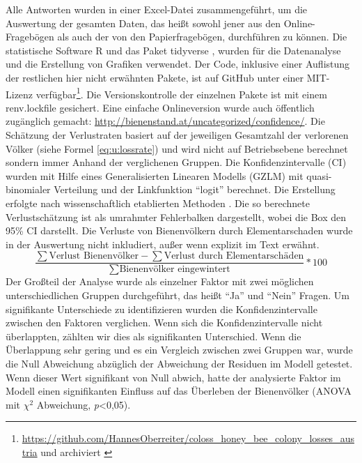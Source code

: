 Alle Antworten wurden in einer Excel-Datei zusammengeführt, um die Auswertung der gesamten Daten, das heißt sowohl jener aus den Online-Fragebögen als auch der von den Papierfragebögen, durchführen zu können. Die statistische Software R \citep{rcoreteam2020} und das Paket tidyverse \citep{wickham2019}, wurden für die Datenanalyse und die Erstellung von Grafiken verwendet. Der Code, inklusive einer Auflistung der restlichen hier nicht erwähnten Pakete, ist auf GitHub unter einer MIT-Lizenz verfügbar\footnote{\url{https://github.com/HannesOberreiter/coloss_honey_bee_colony_losses_austria} und archiviert \cite{HannesOberreiter2019}}. Die Versionskontrolle der einzelnen Pakete ist mit einem renv.lockfile gesichert. Eine einfache Onlineversion wurde auch öffentlich zugänglich gemacht: \url{http://bienenstand.at/uncategorized/confidence/}.
\newline
Die Schätzung der Verlustraten basiert auf der jeweiligen Gesamtzahl der verlorenen Völker (siehe Formel \ref{eq:u:lossrate}) und wird nicht auf Betriebsebene berechnet sondern immer Anhand der verglichenen Gruppen. Die Konfidenzintervalle (CI) wurden mit Hilfe eines Generalisierten Linearen Modells (GZLM) mit quasi-binomialer Verteilung und der Linkfunktion \enquote{logit} berechnet. Die Erstellung erfolgte nach wissenschaftlich etablierten Methoden \citep{vanderzee2013}. Die so berechnete Verlustschätzung ist als umrahmter Fehlerbalken dargestellt, wobei die Box den 95\% CI darstellt. Die Verluste von Bienenvölkern durch Elementarschaden wurde in der Auswertung nicht inkludiert, außer wenn explizit im Text erwähnt.
\begin{equation} \label{eq:u:lossrate}
\frac{
    \sum{\text{Verlust Bienenvölker}}-\sum{\text{Verlust durch Elementarschäden}}
    }{
    \sum{\text{Bienenvölker eingewintert}}
    }
    *100
\end{equation}
\newline
Der Großteil der Analyse wurde als einzelner Faktor mit zwei möglichen unterschiedlichen Gruppen durchgeführt, das heißt \enquote{Ja} und \enquote{Nein} Fragen. Um signifikante Unterschiede zu identifizieren wurden die Konfidenzintervalle zwischen den Faktoren verglichen. Wenn sich die Konfidenzintervalle nicht überlappten, zählten wir dies als signifikanten Unterschied. Wenn die Überlappung sehr gering und es ein Vergleich zwischen zwei Gruppen war, wurde die Null Abweichung abzüglich der Abweichung der Residuen im Modell getestet. Wenn dieser Wert signifikant von Null abwich, hatte der analysierte Faktor im Modell einen signifikanten Einfluss auf das Überleben der Bienenvölker (ANOVA mit $\chi^{2}$ Abweichung, \textit{p}<0,05).
